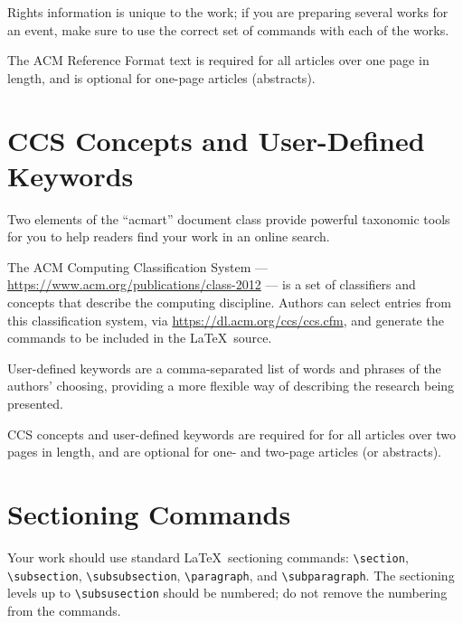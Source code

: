 \documentclass[sigconf]{acmart}
\begin{document}
Rights information is unique to the work; if you are preparing several
works for an event, make sure to use the correct set of commands with
each of the works.

The ACM Reference Format text is required for all articles over one
page in length, and is optional for one-page articles (abstracts).

\section{CCS Concepts and User-Defined Keywords}

Two elements of the ``acmart'' document class provide powerful
taxonomic tools for you to help readers find your work in an online
search.

The ACM Computing Classification System ---
\url{https://www.acm.org/publications/class-2012} --- is a set of
classifiers and concepts that describe the computing
discipline. Authors can select entries from this classification
system, via \url{https://dl.acm.org/ccs/ccs.cfm}, and generate the
commands to be included in the \LaTeX\ source.

User-defined keywords are a comma-separated list of words and phrases
of the authors' choosing, providing a more flexible way of describing
the research being presented.

CCS concepts and user-defined keywords are required for for all
articles over two pages in length, and are optional for one- and
two-page articles (or abstracts).

\section{Sectioning Commands}

Your work should use standard \LaTeX\ sectioning commands:
\verb|\section|, \verb|\subsection|, \verb|\subsubsection|,
\verb|\paragraph|, and \verb|\subparagraph|. The sectioning levels up to
\verb|\subsusection| should be numbered; do not remove the numbering
from the commands.
\end{document}
